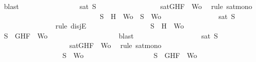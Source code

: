\begin{isabellebody}
\ blast\ \isanewline
\ \ \ \ \ \ \ \ \ \ \ \ \ \ \isamarkupfalse%
\ {\isachardoublequoteopen}sat\ S{\isachardoublequoteclose}\isanewline
\ \ \ \ \ \ \ \ \ \ \ \ \ \ \ \ \isamarkupfalse%
\ {\isacartoucheopen}sat{\isacharparenleft}{\isacharbraceleft}G{\isacharcomma}H{\isacharcomma}F{\isacharbraceright}\ {\isasymunion}\ Wo{\isacharparenright}{\isacartoucheclose}\ \isamarkupfalse%
\ {\isacharparenleft}rule\ sat{\isacharunderscore}mono{\isacharparenright}\isanewline
\ \ \ \ \ \ \ \ \ \ \ \ \isamarkupfalse%
\isanewline
\ \ \ \ \ \ \ \ \ \ \ \ \ \ \isamarkupfalse%
\ {\isachardoublequoteopen}S\ {\isacharequal}\ {\isacharbraceleft}H{\isacharbraceright}\ {\isasymunion}\ Wo\ {\isasymor}\ S\ {\isacharequal}\ Wo{\isachardoublequoteclose}\isanewline
\ \ \ \ \ \ \ \ \ \ \ \ \ \ \isamarkupfalse%
\ {\isachardoublequoteopen}sat\ S{\isachardoublequoteclose}\isanewline
\ \ \ \ \ \ \ \ \ \ \ \ \ \ \isamarkupfalse%
\ {\isacharparenleft}rule\ disjE{\isacharparenright}\isanewline
\ \ \ \ \ \ \ \ \ \ \ \ \ \ \ \ \isamarkupfalse%
\ {\isachardoublequoteopen}S\ {\isacharequal}\ {\isacharbraceleft}H{\isacharbraceright}\ {\isasymunion}\ Wo{\isachardoublequoteclose}\isanewline
\ \ \ \ \ \ \ \ \ \ \ \ \ \ \ \ \isamarkupfalse%
\ \isamarkupfalse%
\ {\isachardoublequoteopen}S\ {\isasymsubseteq}\ {\isacharbraceleft}G{\isacharcomma}H{\isacharcomma}F{\isacharbraceright}\ {\isasymunion}\ Wo{\isachardoublequoteclose}\isanewline
\ \ \ \ \ \ \ \ \ \ \ \ \ \ \ \ \ \ \isamarkupfalse%
\ blast\ \isanewline
\ \ \ \ \ \ \ \ \ \ \ \ \ \ \ \ \isamarkupfalse%
\ {\isachardoublequoteopen}sat\ S{\isachardoublequoteclose}\isanewline
\ \ \ \ \ \ \ \ \ \ \ \ \ \ \ \ \ \ \isamarkupfalse%
\ {\isacartoucheopen}sat{\isacharparenleft}{\isacharbraceleft}G{\isacharcomma}H{\isacharcomma}F{\isacharbraceright}\ {\isasymunion}\ Wo{\isacharparenright}{\isacartoucheclose}\ \isamarkupfalse%
\ {\isacharparenleft}rule\ sat{\isacharunderscore}mono{\isacharparenright}\isanewline
\ \ \ \ \ \ \ \ \ \ \ \ \ \ \isamarkupfalse%
\isanewline
\ \ \ \ \ \ \ \ \ \ \ \ \ \ \ \ \isamarkupfalse%
\ {\isachardoublequoteopen}S\ {\isacharequal}\ Wo{\isachardoublequoteclose}\isanewline
\ \ \ \ \ \ \ \ \ \ \ \ \ \ \ \ \isamarkupfalse%
\ \isamarkupfalse%
\ {\isachardoublequoteopen}S\ {\isasymsubseteq}\ {\isacharbraceleft}G{\isacharcomma}H{\isacharcomma}F{\isacharbraceright}\ {\isasymunion}\ Wo{\isachardoublequoteclose}\isanewline

\end{isabellebody}
